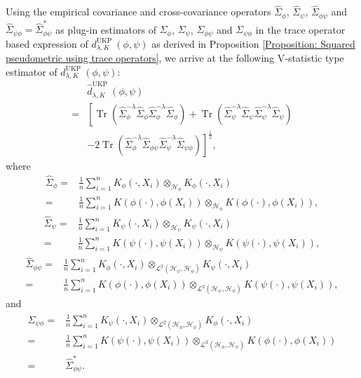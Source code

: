 \documentclass{article}
\theoremstyle{plain}
\newcommand{\HS}{\mathcal{L}^{2}}
\newcommand{\repone}{\phi}
\newcommand{\reptwo}{\psi}
\newcommand{\Hone}{\mathcal{H}_{\phi}}
\newcommand{\Htwo}{\mathcal{H}_{\psi}}
\DeclareMathOperator*{\Tr}{\text{Tr}}
\newcommand{\metricstname}{UKP }
\begin{document}
Using the empirical covariance and cross-covariance operators $\hat{\Sigma}_{\repone}$, $\hat{\Sigma}_{\reptwo}$, $\hat{\Sigma}_{\repone\reptwo}$ and $\hat{\Sigma}_{\reptwo\repone} = \hat{\Sigma}_{\repone\reptwo}^{*}$ as plug-in estimators of $\Sigma_{\repone}$, $\Sigma_{\reptwo}$, $\Sigma_{\repone\reptwo}$ and $\Sigma_{\reptwo\repone}$ in the trace operator based expression of $d_{\lambda,K}^{\text{\metricstname}}(\repone,\reptwo)$ as derived in Proposition \ref{Proposition: Squared pseudometric using trace operators}, we arrive at the following V-statistic type estimator of $d_{\lambda,K}^{\text{\metricstname}}(\repone,\reptwo)$:
\begin{equation}\label{Pseudometric V-statistic estimator}
    \begin{aligned}
        &\hat{d}_{\lambda,K}^{\text{\metricstname}}(\repone,\reptwo)\\
        =& \left[\Tr\left(\hat{\Sigma}_{\repone}^{-\lambda}\hat{\Sigma}_{\repone}\hat{\Sigma}_{\repone}^{-\lambda}\hat{\Sigma}_{\repone}\right) + \Tr\left(\hat{\Sigma}_{\reptwo}^{-\lambda}\hat{\Sigma}_{\reptwo}\hat{\Sigma}_{\reptwo}^{-\lambda}\hat{\Sigma}_{\reptwo}\right)\right.\\
        &\left.-2\Tr\left(\hat{\Sigma}_{\repone}^{-\lambda}\hat{\Sigma}_{\repone\reptwo}\hat{\Sigma}_{\reptwo}^{-\lambda}\hat{\Sigma}_{\reptwo\repone}\right)\right]^{\frac{1}{2}},
    \end{aligned}
\end{equation}
where
\[
\begin{aligned}
    \hat{\Sigma}_{\repone}=&\frac{1}{n}\sum_{i=1}^{n}K_{\repone}(\cdot,X_{i}) \otimes_{\Hone}  K_{\repone}(\cdot,X_{i})\\
    =&\frac{1}{n}\sum_{i=1}^{n}K(\repone(\cdot),\repone(X_{i})) \otimes_{\Hone} K(\repone(\cdot),\repone(X_{i})),
\end{aligned}
\]
\[
\begin{aligned}
    \hat{\Sigma}_{\reptwo}=&\frac{1}{n}\sum_{i=1}^{n}K_{\reptwo}(\cdot,X_{i}) \otimes_{\Htwo}  K_{\reptwo}(\cdot,X_{i})\\
    =&\frac{1}{n}\sum_{i=1}^{n}K(\reptwo(\cdot),\reptwo(X_{i})) \otimes_{\Htwo} K(\reptwo(\cdot),\reptwo(X_{i})),
\end{aligned}\]
\[
\begin{aligned}
    \hat{\Sigma}_{\repone\reptwo}=&\frac{1}{n}\sum_{i=1}^{n}K_{\repone}(\cdot,X_{i}) \otimes_{\HS(\Htwo,\Hone)} K_{\reptwo}(\cdot,X_{i})\\
    =&\frac{1}{n}\sum_{i=1}^{n}K(\repone(\cdot),\repone(X_{i})) \otimes_{\HS(\Htwo,\Hone)} K(\reptwo(\cdot),\reptwo(X_{i})),
\end{aligned}\] and 
\[\begin{aligned}
    \hat{\Sigma}_{\reptwo\repone} =&\frac{1}{n}\sum_{i=1}^{n} K_{\reptwo}(\cdot,X_{i}) \otimes_{\HS(\Hone,\Htwo)}  K_{\repone}(\cdot,X_{i})\\
    =&\frac{1}{n}\sum_{i=1}^{n}K(\reptwo(\cdot),\reptwo(X_{i}))\otimes_{\HS(\Hone,\Htwo)}  K(\repone(\cdot),\repone(X_{i}))\\
    =& \hat{\Sigma}_{\repone\reptwo}^{*}.
\end{aligned}\]
\end{document}
